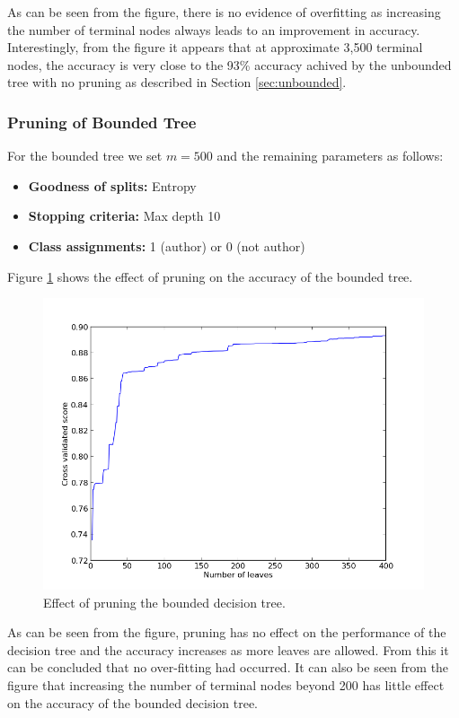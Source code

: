 \documentclass[letterpaper,12pt]{article}
\begin{document}
As can be seen from the figure, there is no evidence of overfitting as increasing the number of terminal nodes always leads to an improvement in accuracy. Interestingly, from the figure it appears that at approximate 3,500 terminal nodes, the accuracy is very close to the 93\% accuracy achived by the unbounded tree with no pruning as described in Section \ref{sec:unbounded}.

\subsubsection{Pruning of Bounded Tree}
For the bounded tree we set $m=500$ and the remaining parameters as follows:

\begin{itemize}
\item\textbf{Goodness of splits:} Entropy
\item\textbf{Stopping criteria:} Max depth 10
\item\textbf{Class assignments:} 1 (author) or 0 (not author)
\end{itemize}

Figure \ref{fig:prune_10} shows the effect of pruning on the accuracy of the bounded tree.

\begin{figure}[ht!]
\includegraphics[width=\textwidth]{images/prune-depth10.png}
\caption{Effect of pruning the bounded decision tree.}\label{fig:prune_10}
\end{figure}

As can be seen from the figure, pruning has no effect on the performance of the decision tree and the accuracy increases as more leaves are allowed. From this it can be concluded that no over-fitting had occurred. It can also be seen from the figure that increasing the number of terminal nodes beyond 200 has little effect on the accuracy of the bounded decision tree.
\end{document}
